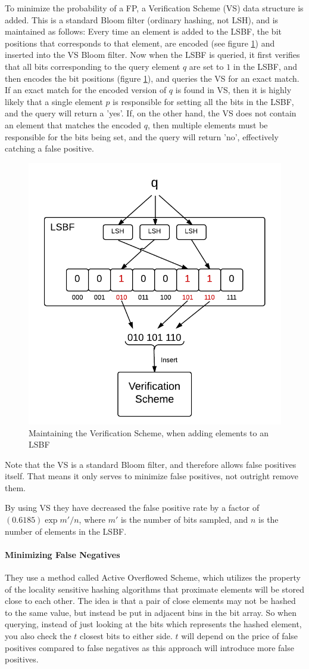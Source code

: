 \documentclass[a4paper,11pt]{article}
\begin{document}
To minimize the probability of a FP, a Verification Scheme (VS) data structure is added.
This is a standard Bloom filter (ordinary hashing, not LSH), and is maintained as follows: Every time an element is added to the LSBF, the bit positions that corresponds to that element, are encoded (see figure \ref{fig:verification_scheme}) and inserted into the VS Bloom filter. 
Now when the LSBF is queried, it first verifies that all bits corresponding to the query element $q$ are set to $1$ in the LSBF, and then encodes the bit positions (figure \ref{fig:verification_scheme}), and queries the VS for an exact match. If an exact match for the encoded version of $q$ is found in VS, then it is highly likely that a single element $p$ is responsible for setting all the bits in the LSBF, and the query will return a 'yes'. If, on the other hand, the VS does not contain an element that matches the encoded $q$, then multiple elements must be responsible for the bits being set, and the query will return 'no', effectively catching a false positive. 

\begin{figure}[H]
\centering
\includegraphics[width=.5\linewidth]{verification_scheme}
\caption{Maintaining the Verification Scheme, when adding elements to an LSBF}
\label{fig:verification_scheme}
\end{figure}

Note that the VS is a standard Bloom filter, and therefore allows false positives itself. That means it only serves to minimize false positives, not outright remove them.

By using VS they have decreased the false positive rate by a factor of $(0.6185)\exp{m'/n}$, where $m'$ is the number of bits sampled, and $n$ is the number of elements in the LSBF.

\paragraph{Minimizing False Negatives}
They use a method called Active Overflowed Scheme, which utilizes the property of the locality sensitive hashing algorithms that proximate elements will be stored close to each other. The idea is that a pair of close elements may not be hashed to the same value, but instead be put in adjacent bins in the bit array. So when querying, instead of just looking at the bits which represents the hashed element, you also check the $t$ closest bits to either side. $t$ will depend on the price of false positives compared to false negatives as this approach will introduce more false positives.
\end{document}
